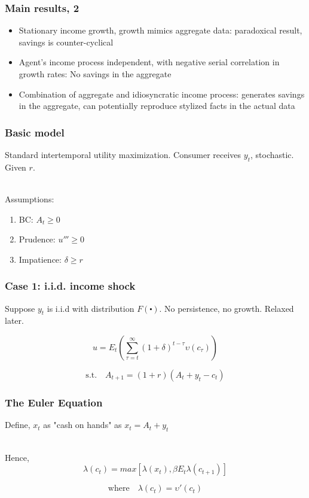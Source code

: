 \documentclass[mathserif]{beamer}
\begin{document}
\begin{frame}
\frametitle{Main results, 2}
\begin{itemize}
  \setlength\itemsep{1em}
  \item Stationary income growth, growth mimics aggregate data: paradoxical result, savings is counter-cyclical
  \item Agent's income process independent, with negative serial correlation in growth rates: No savings in the aggregate
  \item Combination of aggregate and idiosyncratic income process: generates savings in the aggregate, can potentially reproduce stylized facts in the actual data
\end{itemize}
\end{frame}

\begin{frame}
\frametitle{Basic model}
Standard intertemporal utility maximization. Consumer receives \(y_{t}\), stochastic. Given $r$. \\\

Assumptions: 
\begin{enumerate}
  \item BC: \(A_{t} \geq 0\)
  \item Prudence: \(u''' \geq 0\)
  \item Impatience: \(\delta \geq r\)
\end{enumerate}
\end{frame}

\begin{frame}
\frametitle{Case 1: i.i.d. income shock}

Suppose \(y_{t}\) is i.i.d with distribution $F(\centerdot)$. No persistence, no growth. Relaxed later.

\begin{equation}\label{1}
  u = E_{t}(\sum_{\tau = t}^{\infty}(1+\delta)^{t-\tau}\upsilon(c_{\tau}))
\end{equation}

\begin{equation}\label{2}
 \text{s.t.}\quad A_{t+1} = (1+r)(A_{t} + y_{t} - c_{t})
\end{equation}
\end{frame}

\begin{frame}
\frametitle{The Euler Equation}
Define, $x_{t}$ as "cash on hands" as \(x_{t} = A_{t} + y_{t}\) \\\

Hence, 
\begin{equation}\label{4}
 \lambda(c_{t}) = max[\lambda(x_{t}), \beta E_{t} \lambda(c_{t+1})]
\end{equation}

\begin{equation*}
\text{where}\quad\lambda(c_{t}) = \upsilon'(c_{t})
\end{equation*}
\end{frame}
\end{document}
